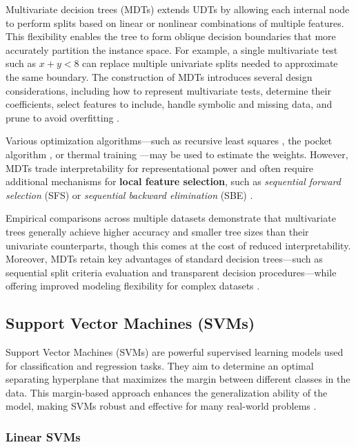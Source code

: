 Multivariate decision trees (MDTs) extends UDTs by allowing each internal node to perform splits based on linear or nonlinear combinations of multiple features. This flexibility enables the tree to form oblique decision boundaries that more accurately partition the instance space. For example, a single multivariate test such as \(x + y < 8\) can replace multiple univariate splits needed to approximate the same boundary. The construction of MDTs introduces several design considerations, including how to represent multivariate tests, determine their coefficients, select features to include, handle symbolic and missing data, and prune to avoid overfitting \citep{brodley1995}.

Various optimization algorithms---such as recursive least squares \citep{young1984}, the pocket algorithm \citep{gallant1986}, or thermal training \citep{frean1990}---may be used to estimate the weights. However, MDTs trade interpretability for representational power and often require additional mechanisms for \textbf{local feature selection}, such as \emph{sequential forward selection} (SFS) or \emph{sequential backward elimination} (SBE) \citep{kittler1986}.

Empirical comparisons across multiple datasets demonstrate that multivariate trees generally achieve higher accuracy and smaller tree sizes than their univariate counterparts, though this comes at the cost of reduced interpretability. Moreover, MDTs retain key advantages of standard decision trees---such as sequential split criteria evaluation and transparent decision procedures---while offering improved modeling flexibility for complex datasets \citep{kozial2009, friedl1997, huan1998, canete}.

\subsection{Support Vector Machines (SVMs)}\label{support-vector-machines-svms}

Support Vector Machines (SVMs) are powerful supervised learning models used for classification and regression tasks. They aim to determine an optimal separating hyperplane that maximizes the margin between different classes in the data. This margin-based approach enhances the generalization ability of the model, making SVMs robust and effective for many real-world problems \citep{cristianini2000}.

\subsubsection{Linear SVMs}\label{linear-svms}

